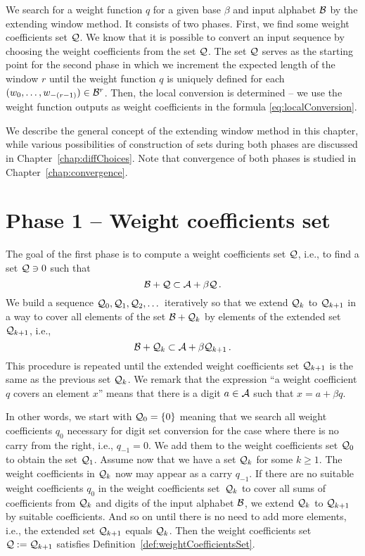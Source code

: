 We search for a weight function $q$ for a given base $\beta$ and input alphabet $\mathcal{B}$ by the extending window method. It consists of two phases. First, we find some weight coefficients set $\mathcal{Q}$. We know that it is possible to convert an input sequence by choosing the weight coefficients from the set $\mathcal{Q}$. The set $\mathcal{Q}$ serves as the starting point for the second phase in which we increment the expected length of the window $r$ until the weight function $q$ is uniquely defined for each $(w_{0}, \dots, w_{-(r-1)}) \in \mathcal{B}^{r}$. Then, the local conversion is determined -- we use the weight function outputs as weight coefficients in the formula \eqref{eq:localConversion}.    

We describe the general concept of the extending window method in this chapter, while various possibilities of construction of sets during both phases are discussed in Chapter~\ref{chap:diffChoices}.
Note that  convergence of both phases is studied in Chapter~\ref{chap:convergence}.
      
\section{Phase 1 -- Weight coefficients set}
\label{subsec:phase1}
The goal of the first phase is to compute a weight coefficients set $\mathcal{Q}$, i.e., to find a set $\mathcal{Q} \ni 0$ such that 
$$
    \mathcal{B} + \mathcal{Q} \subset \mathcal{A} + \beta \mathcal{Q}\,.
$$  
We build a sequence $\mathcal{Q}_0, \mathcal{Q}_1, \mathcal{Q}_2,\dots$ iteratively so that we extend $\mathcal{Q}_k$ to $\mathcal{Q}_{k+1}$ in a way to cover all elements of the set $\mathcal{B}+\mathcal{Q}_k$ by elements of the extended set $\mathcal{Q}_{k+1}$, i.e.,
$$
\mathcal{B}+ \mathcal{Q}_k \subset \mathcal{A} + \beta \mathcal{Q}_{k+1}\,.
$$
This procedure is repeated until the extended weight coefficients set $\mathcal{Q}_{k+1}$ is the same as the previous set $\mathcal{Q}_{k}$. We remark that the expression ``a weight coefficient $q$ covers an element $x$'' means that there is a digit $a \in \mathcal{A}$ such that $x=a + \beta q$. 

In other words, we start with $\mathcal{Q}_0=\{0\}$ meaning that we search all weight coefficients $q_0$ necessary for digit set conversion for the case where there is no carry from the right, i.e., $q_{-1}=0$. We add them to the weight coefficients set $\mathcal{Q}_0$ to obtain the set $\mathcal{Q}_1$. Assume now that we have a set $\mathcal{Q}_k$ for some $k\geq 1$. The weight coefficients in $\mathcal{Q}_k$ now may appear as a carry $q_{-1}$. If there are no suitable weight coefficients $q_0$ in the weight coefficients set~$\mathcal{Q}_k$ to cover all sums of coefficients from $\mathcal{Q}_k$ and digits of the input alphabet $\mathcal{B}$, we extend $\mathcal{Q}_k$ to $\mathcal{Q}_{k+1}$ by  suitable coefficients. And so on until there is no need to add more elements, i.e., the extended set $\mathcal{Q}_{k+1}$ equals $\mathcal{Q}_k$. Then the weight coefficients set $\mathcal{Q}:=\mathcal{Q}_{k+1}$ satisfies Definition~\ref{def:weightCoefficientsSet}. 

